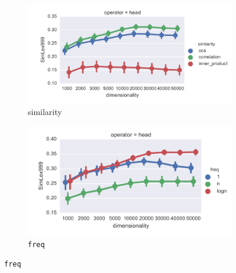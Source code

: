 \begin{figure}

  \centering

  \begin{subfigure}[t]{0.49\textwidth}
    \includegraphics[width=\textwidth]{supplement/figures/SimLex999-interaction-similarity}
    \caption{similarity}
    \label{fig:SimLex999-interaction-similarity}
  \end{subfigure}
  \begin{subfigure}[t]{0.49\textwidth}
    \includegraphics[width=\textwidth]{supplement/figures/SimLex999-interaction-freq}
    \caption{\texttt{freq}}
    \label{fig:SimLex999-interaction-freq}
  \end{subfigure}


\end{figure}
